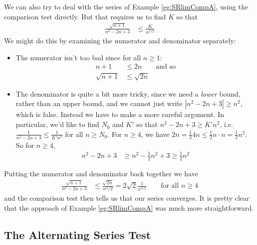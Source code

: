 \begin{eg}[$\sum_{n=1}^\infty\frac{\sqrt{n+1}}{n^2-2n+3}$, again]
          \label{eg:SRlimCompAbis}
We can also try to deal with the series of Example \ref{eg:SRlimCompA},
using the comparison test directly.
But that requires us to find $K$ so that
\begin{align*}
  \frac{\sqrt{n+1}}{n^2-2n+3} & \leq \frac{K}{n^{3/2}}
\end{align*}
We might do this by examining the numerator and denominator separately:
\begin{itemize}
 \item The numerator isn't too bad since for all $n \geq 1$:
 \begin{align*}
  n+1 &\leq 2n \qquad \text{and so}\\
  \sqrt{n+1} &\leq \sqrt{2n}
\end{align*}
\item The denominator is quite a bit more tricky, since we need a
\emph{lower} bound, rather than an upper bound, and we cannot
just write  $|n^2-2n+3| \ge n^2$, which is false.
Instead we have to make a more careful argument. In particular,
we'd like to find $N_0$ and $K'$ so that $n^2-2n+3\ge  K'n^2$,
i.e. $\frac{1}{n^2-2n+3}\le\frac{1}{K'n^2}$ for all
$n \geq N_0$. For $n\ge 4$, we have $2n = \frac{1}{2} 4n\le
\frac{1}{2}n\cdot n=\frac{1}{2}n^2$.
So for  $n\ge 4$,
\begin{align*}
  n^2-2n+3 & \geq n^2 -\frac{1}{2}n^2 + 3
\ge \frac{1}{2} n^2
\end{align*}
\end{itemize}
Putting the numerator and denominator back together we have
\begin{align*}
  \frac{\sqrt{n+1}}{n^2-2n+3} & \leq \frac{\sqrt{2n}}{n^2/2}
= 2\sqrt{2}\frac{1}{n^{3/2}}
\qquad\text{for all $n\ge 4$}
\end{align*}
and the comparison test then tells us that our series converges.
It is pretty clear that the approach of Example
 \ref{eg:SRlimCompA} was much more straightforward.
\end{eg}

\subsection{The Alternating Series Test}\label{sec:AST}

